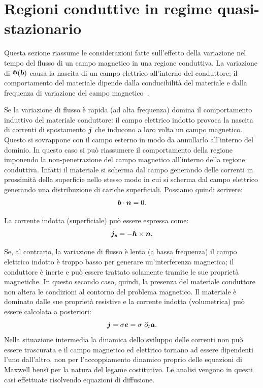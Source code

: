 \section{Regioni conduttive in regime quasi-stazionario}

Questa sezione riassume le considerazioni fatte sull'effetto della variazione nel tempo del flusso di un campo magnetico in una regione conduttiva. La variazione di $\Phi(\boldsymbol{b})$ causa la nascita di un campo elettrico all'interno del conduttore; il comportamento del materiale dipende dalla conducibilità del materiale e dalla frequenza di variazione del campo magnetico\ \citep{haus_electromagnetic_1989}.


Se la variazione di flusso è rapida (ad alta frequenza) domina il comportamento induttivo del materiale conduttore: il campo elettrico indotto provoca la nascita di correnti di spostamento $\boldsymbol{j}$ che inducono a loro volta un campo magnetico. Questo si sovrappone con il campo esterno in modo da annullarlo all'interno del dominio. In questo caso si può riassumere il comportamento della regione imponendo la non-penetrazione del campo magnetico all'interno della regione conduttiva. Infatti il materiale si scherma dal campo generando delle correnti in prossimità della superficie nello stesso modo in cui si scherma dal campo elettrico generando una distribuzione di cariche superficiali. Possiamo quindi scrivere: 
\begin{equation}
\label{eq:4cond1}
\boldsymbol{b}\cdot \boldsymbol{n} = 0.
\end{equation}

La corrente indotta (superficiale) può essere espressa come:
\begin{equation}
\label{eq:4cond2}
\boldsymbol{j_{s}} = -\boldsymbol{h}\times\boldsymbol{n},
\end{equation}

Se, al contrario, la variazione di flusso è lenta (a bassa frequenza) il campo elettrico indotto è troppo basso per generare un'interferenza magnetica; il conduttore è inerte e può essere trattato solamente tramite le sue proprietà magnetiche. 
In questo secondo caso, quindi, la presenza del materiale conduttore non altera le condizioni al contorno del problema magnetico. Il materiale è dominato dalle sue proprietà resistive e la corrente indotta (volumetrica) può essere calcolata a posteriori:
\begin{equation}
\label{eq:4cond3}
\boldsymbol{j} = \sigma\boldsymbol{e} = \sigma~\partial_t\boldsymbol{a}.
\end{equation}
Nella situazione intermedia la dinamica dello sviluppo delle correnti non può essere trascurata e il campo magnetico ed elettrico tornano ad essere dipendenti l'uno dall'altro, non per l'accoppiamento dinamico proprio delle equazioni di Maxwell bensì per la natura del legame costitutivo. Le analisi vengono in questi casi effettuate risolvendo equazioni di diffusione.


